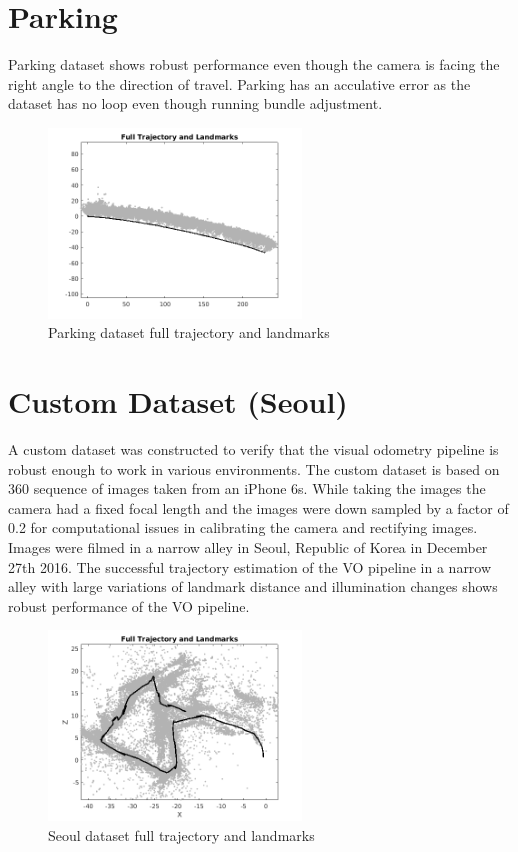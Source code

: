 \section{Parking} \label{sec:parking}
Parking dataset shows robust performance even though the camera is facing the right angle to the direction of travel. Parking has an acculative error as the dataset has no loop even though running bundle adjustment. 

\begin{figure}[h]
\centering
\includegraphics[width=0.6\textwidth]{Results_Parking.png}
\caption{Parking dataset full trajectory and landmarks}
\label{fig:	results_parking}
\end{figure}

\section{Custom Dataset (Seoul)} \label{sec:Custom our_dataset}

A custom dataset was constructed to verify that the visual odometry pipeline is robust enough to work in various environments. The custom dataset is based on 360 sequence of images taken from an iPhone 6s. While taking the images the camera had a fixed focal length and the images were down sampled by a factor of 0.2 for computational issues in calibrating the camera and rectifying images. Images were filmed in a narrow alley in Seoul, Republic of Korea in December 27th 2016.\newline
The successful trajectory estimation of the VO pipeline in a narrow alley with large variations of landmark distance and illumination changes shows robust performance of the VO pipeline.

\begin{figure}[h]
\centering
\includegraphics[width=0.6\textwidth]{Results_OWN.png}
\caption{Seoul dataset full trajectory and landmarks}
\end{figure}


